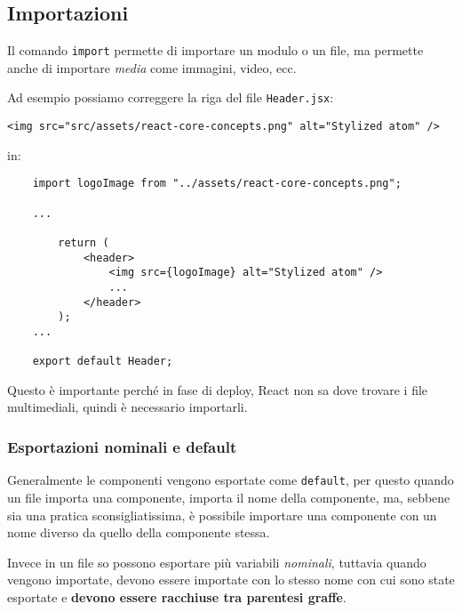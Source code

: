 \documentclass[12pt]{article}
\begin{document}
\subsection{Importazioni}
Il comando {\tt import} permette di importare un modulo o un file,
ma permette anche di importare {\it media} come immagini, video, ecc.

Ad esempio possiamo correggere la riga del file {\tt Header.jsx}:
\begin{verbatim}
<img src="src/assets/react-core-concepts.png" alt="Stylized atom" />
\end{verbatim}
in:
\begin{verbatim}
    import logoImage from "../assets/react-core-concepts.png";

    ...
    
        return (
            <header>
                <img src={logoImage} alt="Stylized atom" />
                ...
            </header>
        );
    ...
    
    export default Header;
\end{verbatim}
Questo è importante perché in fase di deploy, React non sa dove trovare i file
multimediali, quindi è necessario importarli.

\subsubsection{Esportazioni nominali e default}
Generalmente le componenti vengono esportate come {\tt default},
per questo quando un file importa una componente, importa il nome
della componente, ma, sebbene sia una pratica sconsigliatissima,
è possibile importare una componente con un nome diverso da quello
della componente stessa.

Invece in un file so possono esportare più variabili {\it nominali},
tuttavia quando vengono importate, devono essere importate con lo stesso
nome con cui sono state esportate e {\bf devono essere racchiuse tra parentesi graffe}.
\end{document}
